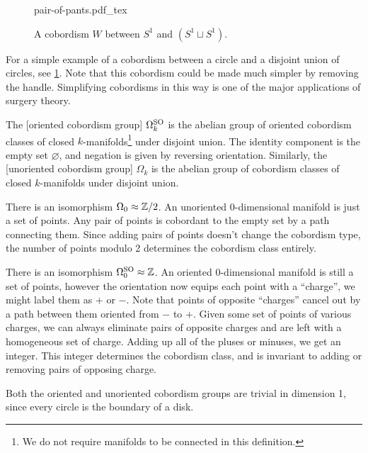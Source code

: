 \begin{figure}[ht]
	\centering
	{pair-of-pants.pdf_tex}
	\caption{A cobordism $W$ between $S^1$ and $(S^1\sqcup S^1)$.}\label{fig:pair-of-pants}
\end{figure}

For a simple example of a cobordism between a circle and a disjoint union of circles, see \cref{fig:pair-of-pants}. Note that this cobordism could be made much simpler by removing the handle. Simplifying cobordisms in this way is one of the major applications of surgery theory.

\begin{definition}
	The [oriented cobordism group] $\Omega^{\mathrm{SO}}_k$ is the abelian group of oriented cobordism classes of closed $k$-manifolds\footnote{We do not require manifolds to be connected in this definition.}
	under disjoint union. The identity component is the empty set $\varnothing$, and negation is given by reversing orientation. Similarly, the [unoriented cobordism group] $\Omega_k$ is the abelian group of cobordism classes of closed $k$-manifolds under disjoint union.
\end{definition}

\begin{example}
	There is an isomorphism $\Omega_0\approx \mathbb{Z}/2$. An unoriented 0-dimensional manifold is just a set of points. Any pair of points is cobordant to the empty set by a path connecting them. Since adding pairs of points doesn't change the cobordism type, the number of points modulo 2 determines the cobordism class entirely.
\end{example}

\begin{example}
	There is an isomorphism $\Omega_0^{\mathrm{SO}} \approx \mathbb{Z}$. An oriented 0-dimensional manifold is still a set of points, however the orientation now equips each point with a ``charge'', we might label them as $+$ or $-$. Note that points of opposite ``charges'' cancel out by a path between them oriented from $-$ to $+$. Given some set of points of various charges, we can always eliminate pairs of opposite charges and are left with a homogeneous set of charge. Adding up all of the pluses or minuses, we get an integer. This integer determines the cobordism class, and is invariant to adding or removing pairs of opposing charge.
\end{example}

\begin{example}
	Both the oriented and unoriented cobordism groups are trivial in dimension 1, since every circle is the boundary of a disk.
\end{example}

